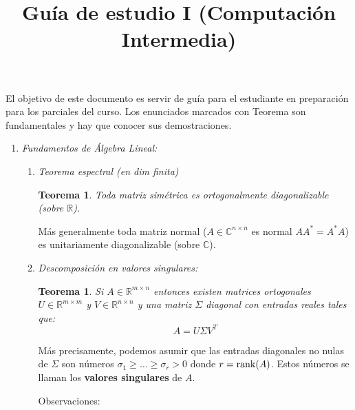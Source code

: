 \documentclass[12pt]{amsart}
\title{Guía de estudio I (Computación Intermedia)}
\newtheorem{theorem}[lemma]{Teorema}
\theoremstyle{definition}
\renewcommand{\geq}{\geqslant}
\newcommand{\CC}{\ensuremath{\mathbb{C}}}
\newcommand{\RR}{\ensuremath{\mathbb{R}}}
\begin{document}
\maketitle
El objetivo de este documento es servir de guía para el estudiante en preparación para los parciales del curso.
Los enunciados marcados con Teorema son fundamentales y hay que conocer sus demostraciones.

\begin{enumerate}
\item \emph{Fundamentos de Álgebra Lineal:}
\begin{enumerate}
\item \emph{Teorema espectral (en dim finita)}

\begin{theorem}Toda matriz simétrica es ortogonalmente diagonalizable (sobre $\RR$).\end{theorem}
Más generalmente toda matriz normal ($A\in \CC^{n\times n}$ es normal $AA^*=A^*A$) es unitariamente diagonalizable (sobre $\CC$).
\item \emph{Descomposición en valores singulares:}
\begin{theorem} Si $A\in \RR^{m\times n}$ entonces existen matrices ortogonales $U\in \RR^{m\times m}$ y $V\in \RR^{n\times n}$ y una matriz $\Sigma$ diagonal con entradas reales tales que:
\[A=U\Sigma V^T\]
\end{theorem}
M\'as precisamente, podemos asumir que las entradas diagonales no nulas de $\Sigma$ son n\'umeros $\sigma_1\geq \dots \geq  \sigma_r>0$ donde $r={\rm rank}(A)$. Estos números se llaman los {\bf valores singulares} de $A$. 

Observaciones:


\end{enumerate}
\end{enumerate}
\end{document}
